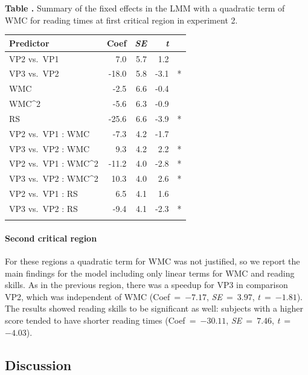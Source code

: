 \documentclass{frontiersSCNS}\usepackage{knitr}
\begin{document}
\begin{table}[h]
\textbf{\label{tab:summary-exp2} Table .}{ Summary of the fixed effects in the LMM with a quadratic term of WMC for reading times at first critical region in experiment 2.}

\processtable{ }
{


\begin{tabular}{l r r r @{ }r@{ } }\toprule
Predictor &  Coef & \textit{SE} & \textit{t } & {} \\ \midrule
VP2 vs.\ VP1 &    7.0 & 5.7 &   1.2 &     \\
VP3 vs.\ VP2 &  -18.0 & 5.8 &  -3.1 &  *  \\
WMC &   -2.5 & 6.6 &  -0.4 &     \\
WMC^2 &   -5.6 & 6.3 &  -0.9 &     \\
RS &  -25.6 & 6.6 &  -3.9 &  *  \\
VP2 vs.\ VP1 : WMC &   -7.3 & 4.2 &  -1.7 &     \\
VP3 vs.\ VP2 : WMC &    9.3 & 4.2 &   2.2 &  *  \\
VP2 vs.\ VP1 : WMC^2 &  -11.2 & 4.0 &  -2.8 &  *  \\
VP3 vs.\ VP2 : WMC^2 &   10.3 & 4.0 &   2.6 &  *  \\
VP2 vs.\ VP1 : RS &    6.5 & 4.1 &   1.6 &     \\
VP3 vs.\ VP2 : RS &   -9.4 & 4.1 &  -2.3 &  *  \\
\botrule
\end{tabular}

 }{}
\end{table}




\paragraph{Second critical region}
For these regions a quadratic term for WMC was not justified, so we report the main findings for the model including only linear terms for WMC and reading skills. As in the previous region, there was a speedup for VP3 in comparison VP2, which was independent of WMC (\mbox{Coef = $-7.17$}, \mbox{\textit{SE} = $3.97$}, \mbox{\textit{t} = $-1.81$}). The results showed reading skills to be significant as well: subjects with a higher score tended to have shorter reading times (\mbox{Coef = $-30.11$}, \mbox{\textit{SE} = $7.46$}, \mbox{\textit{t} = $-4.03$}).


\subsection{Discussion}
\end{document}

